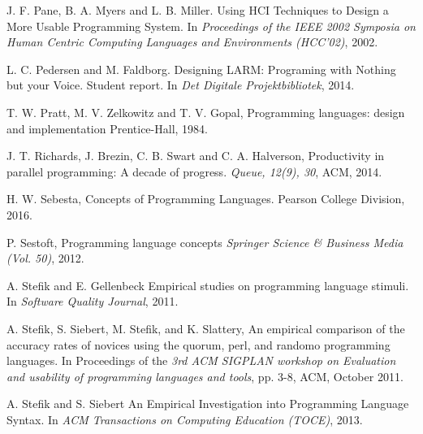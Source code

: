\documentclass[preprint,10pt]{sigplanconf}
\begin{document}
\begin{thebibliography}{}
J. F. Pane, B. A. Myers and L. B. Miller. \newblock Using HCI Techniques to Design a More Usable Programming System. \newblock In \emph{Proceedings of the IEEE 2002 Symposia on Human Centric Computing Languages and Environments (HCC’02)}, 2002.

L. C. Pedersen and M. Faldborg. \newblock Designing LARM: Programing with Nothing but your Voice. \newblock Student report. In \emph{Det Digitale Projektbibliotek}, 2014.

T. W. Pratt, M. V. Zelkowitz and T. V.  Gopal, \newblock Programming languages: design and implementation \newblock Prentice-Hall, 1984.

J. T. Richards, J.  Brezin, C. B. Swart and C. A. Halverson, \newblock Productivity in parallel programming: A decade of progress. \newblock \emph{Queue, 12(9), 30}, ACM, 2014.

H. W. Sebesta, \newblock Concepts of Programming Languages. \newblock Pearson College Division, 2016.

P. Sestoft, \newblock Programming language concepts  \newblock \emph{Springer Science \& Business Media (Vol. 50)}, 2012.

A. Stefik and E. Gellenbeck \newblock Empirical studies on programming language stimuli. \newblock In \emph{Software Quality Journal}, 2011.

A. Stefik, S. Siebert, M. Stefik, and K. Slattery, \newblock An empirical comparison of the accuracy rates of novices using the quorum, perl, and randomo programming languages. \newblock In Proceedings of the \emph{3rd ACM SIGPLAN workshop on Evaluation and usability of programming languages and tools}, pp. 3-8, ACM, October 2011.

A. Stefik and S. Siebert \newblock An Empirical Investigation into Programming Language Syntax. \newblock In \emph{ACM Transactions on Computing Education (TOCE)}, 2013.


\end{thebibliography}
\end{document}
